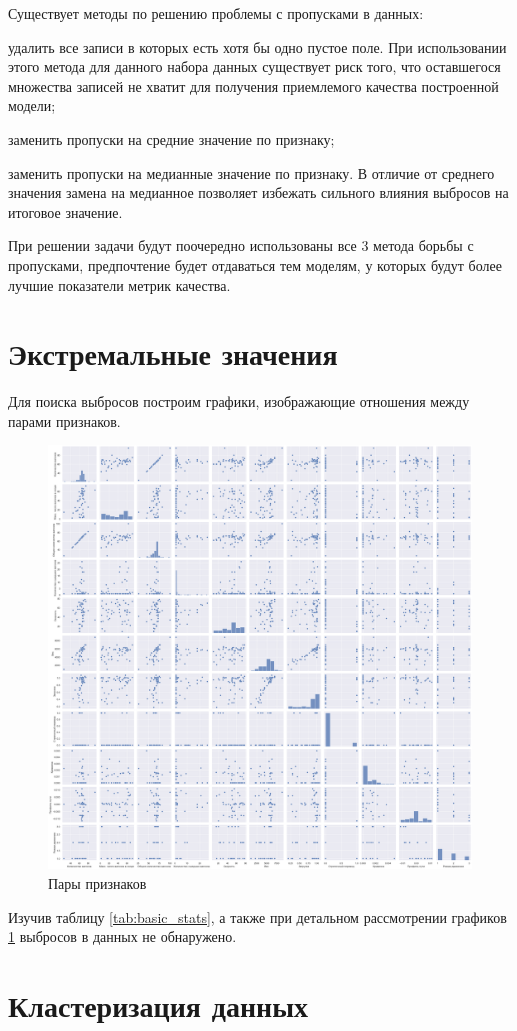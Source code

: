 Существует методы по решению проблемы с пропусками в данных:
\begin{description}[font=$\bullet$]
    \item удалить все записи в которых есть хотя бы одно пустое поле. При использовании этого метода для данного набора данных существует риск того, что оставшегося множества записей не хватит для получения приемлемого качества построенной модели;
    \item заменить пропуски на средние значение по признаку;
    \item заменить пропуски на медианные значение по признаку. В отличие от среднего значения замена на медианное позволяет избежать сильного влияния выбросов на итоговое значение.
\end{description}
При решении задачи будут поочередно использованы все 3 метода борьбы с пропусками, предпочтение будет отдаваться тем моделям, у которых будут более лучшие показатели метрик качества.

\section{Экстремальные значения}

Для поиска выбросов построим графики, изображающие отношения между парами признаков.\\

\begin{figure}[h]
\begin{center}
\includegraphics[width=0.9\linewidth]{src/img/pair_plot.png}
\caption{Пары признаков}
\label{fig:pair_plot}
\end{center}
\end{figure}

Изучив таблицу \ref{tab:basic_stats}, а также при детальном рассмотрении графиков \ref{fig:pair_plot} выбросов в данных не обнаружено.

\section{Кластеризация данных}


